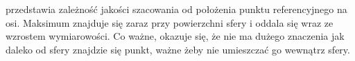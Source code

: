  przedstawia zależność jakości szacowania od położenia punktu referencyjnego na osi. Maksimum znajduje się zaraz przy powierzchni sfery i oddala się wraz ze wzrostem wymiarowości. Co ważne, okazuje się, że nie ma dużego znaczenia jak daleko od sfery znajdzie się punkt, ważne żeby nie umieszczać go wewnątrz sfery.


